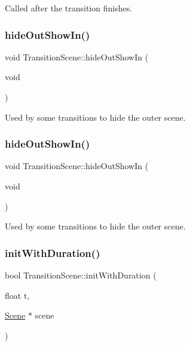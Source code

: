 Called after the transition finishes. \mbox{\label{classTransitionScene_a0bed877005034028e96c266d996c924d}} 
\subsubsection{\texorpdfstring{hide\+Out\+Show\+In()}{hideOutShowIn()}\hspace{0.1cm}{\footnotesize\ttfamily [1/2]}}
{\footnotesize\ttfamily void Transition\+Scene\+::hide\+Out\+Show\+In (\begin{DoxyParamCaption}\item[{void}]{ }\end{DoxyParamCaption})}

Used by some transitions to hide the outer scene. \mbox{\label{classTransitionScene_a0bed877005034028e96c266d996c924d}} 
\subsubsection{\texorpdfstring{hide\+Out\+Show\+In()}{hideOutShowIn()}\hspace{0.1cm}{\footnotesize\ttfamily [2/2]}}
{\footnotesize\ttfamily void Transition\+Scene\+::hide\+Out\+Show\+In (\begin{DoxyParamCaption}\item[{void}]{ }\end{DoxyParamCaption})}

Used by some transitions to hide the outer scene. \mbox{\label{classTransitionScene_a8d74011248967a549d855d95056d5db6}} 
\subsubsection{\texorpdfstring{init\+With\+Duration()}{initWithDuration()}\hspace{0.1cm}{\footnotesize\ttfamily [1/2]}}
{\footnotesize\ttfamily bool Transition\+Scene\+::init\+With\+Duration (\begin{DoxyParamCaption}\item[{float}]{t,  }\item[{\hyperlink{classScene}{Scene} $\ast$}]{scene }\end{DoxyParamCaption})}

